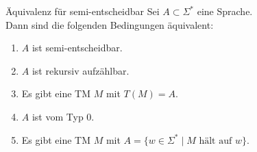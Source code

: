 \begin{Satz}{Äquivalenz für semi-entscheidbar}
    Sei $A \subset \Sigma^\ast$ eine Sprache.\\
    Dann sind die folgenden Bedingungen äquivalent:
    \begin{enumerate}[label=(\arabic*)]
        \item
        $A$ ist semi-entscheidbar.
        
        \item
        $A$ ist rekursiv aufzählbar.
        
        \item
        Es gibt eine TM $M$ mit $T(M) = A$.
        
        \item
        $A$ ist vom Typ 0.
        
        \item
        Es gibt eine TM $M$ mit $A = \{w \in \Sigma^\ast \;|\; M \text{ hält auf } w\}$.
    \end{enumerate}
\end{Satz}


